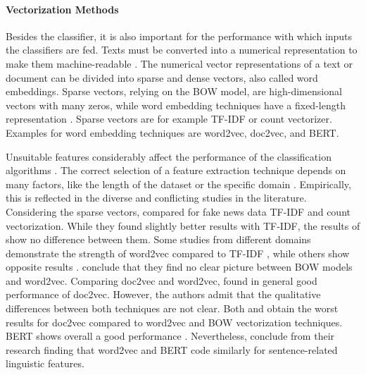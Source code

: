 \documentclass[12pt, a4paper, titlepage]{article}
\begin{document}
\paragraph{Vectorization Methods}
Besides the classifier, it is also important for the performance with which inputs the classifiers are fed. Texts must be converted into a numerical representation to make them machine-readable \citep{singh2019}. The numerical vector representations of a text or document can be divided into sparse and dense vectors, also called word embeddings. Sparse vectors, relying on the \ac{BOW} model, are high-dimensional vectors with many zeros, while word embedding techniques have a fixed-length representation \citep{almeida2019}. Sparse vectors are for example \ac{TF-IDF} or count vectorizer. Examples for word embedding techniques are word2vec, doc2vec, and \ac{BERT}. 

Unsuitable features considerably affect the performance of the classification algorithms \citep{cahyani2021}. The correct selection of a feature extraction technique depends on many factors, like the length of the dataset or the specific domain \citep{arora2021}. Empirically, this is reflected in the diverse and conflicting studies in the literature. Considering the sparse vectors, \citet{wendland2021} compared for fake news data \ac{TF-IDF} and count vectorization. While they found slightly better results with \ac{TF-IDF}, the results of \citet{WangY2017} show no difference between them. Some studies from different domains demonstrate the strength of word2vec compared to \ac{TF-IDF} \citep{arora2021, rahmawati2016}, while others show opposite results \citep{zhu2016,cahyani2021}. \citet{shao2018} conclude that they find no clear picture between \ac{BOW} models and word2vec. Comparing doc2vec and word2vec, \citet{lau2016} found in general good performance of doc2vec. However, the authors admit that the qualitative differences between both techniques are not clear. Both \citet{shao2018} and \citet{WangY2017} obtain the worst results for doc2vec compared to word2vec and \ac{BOW} vectorization techniques. \ac{BERT} shows overall a good performance \citep{gonzalez2020}. Nevertheless, \citet{miaschi2020} conclude from their research finding that word2vec and \ac{BERT} code similarly for sentence-related linguistic features.  
\end{document}
